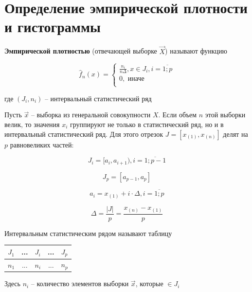\documentclass[a4paper,14pt]{extreport} %
\begin{document}
\section{Определение эмпирической плотности и гистограммы}

\hfill 

    \textbf{Эмпирической плотностью} (отвечающей выборке $\vec X$) называют функцию

    \begin{equation*}
        \hat f_n(x) =
        \begin{cases}
            \frac{n_i}{n \Delta}, x \in J_i, i = \overline{1; p} \\
            0, \text{ иначе} \\
        \end{cases}
    \end{equation*}

где $(J_i, n_i)$ -- интервальный статистический ряд

\hfill

Пусть $\vec x$ -- выборка из генеральной совокупности $X$. Если объем $n$ этой выборки велик, то значения $x_i$ группируют не только в статистический ряд, но и в интервальный статистический ряд. Для этого отрезок
$J = [x_{(1)}, x_{(n)}]$ делят на $p$ равновеликих частей:

\begin{equation*}
    J_i = [a_i, a_{i+1}), i = \overline{1; p - 1}
\end{equation*}

\begin{equation*}
    J_p = [a_{p-1}, a_p]
\end{equation*}

$$a_i = x_{(1)} + i\cdot\Delta, i = \overline{1;p}$$

$$\Delta = \frac{|J|}{p} = \frac{x_{(n)} - x_{(1)}}{p}$$

    Интервальным статистическим рядом называют таблицу

    \begin{table}[H]
        \centering
        \begin{tabular}{|c|c|c|c|c|}
            \hline
            $J_1$ & ... & $J_i$ & ... & $J_p$ \\
            \hline
            $n_1$ & ... & $n_i$ & ... & $n_p$ \\
            \hline
        \end{tabular}
    \end{table}

    Здесь $n_i$ -- количество элементов выборки $\vec x$, которые
    $\in J_i$
    
\end{document}
